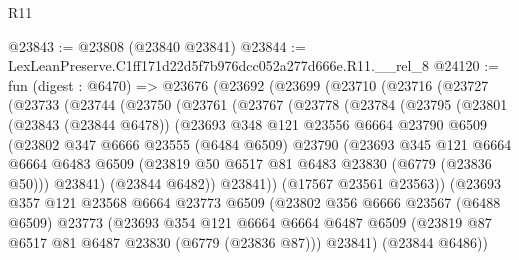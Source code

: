 \begin{lexlean}{R11}
\begin{coremodule}
@23843 := @23808 (@23840 @23841)
@23844 := LexLeanPreserve.C1ff171d22d5f7b976dcc052a277d666e.R11.__rel_8
@24120 := fun (digest : @6470) =>
  @23676
    (@23692
      (@23699
        (@23710
          (@23716
            (@23727
              (@23733
                (@23744
                  (@23750
                    (@23761
                      (@23767
                        (@23778
                          (@23784
                            (@23795
                              (@23801
                                (@23843 (@23844 @6478))
                                (@23693
                                  @348
                                  @121
                                  @23556
                                  @6664
                                  @23790
                                  @6509
                                  (@23802
                                    @347
                                    @6666
                                    @23555
                                    (@6484 @6509)
                                    @23790
                                    (@23693
                                      @345
                                      @121
                                      @6664
                                      @6664
                                      @6483
                                      @6509
                                      (@23819 @50 @6517 @81 @6483 @23830 (@6779 (@23836 @50)))
                                      @23841)
                                    (@23844 @6482))
                                  @23841))
                              (@17567 @23561 @23563))
                            (@23693
                              @357
                              @121
                              @23568
                              @6664
                              @23773
                              @6509
                              (@23802
                                @356
                                @6666
                                @23567
                                (@6488 @6509)
                                @23773
                                (@23693
                                  @354
                                  @121
                                  @6664
                                  @6664
                                  @6487
                                  @6509
                                  (@23819 @87 @6517 @81 @6487 @23830 (@6779 (@23836 @87)))
                                  @23841)
                                (@23844 @6486))

\end{coremodule}
\end{lexlean}
